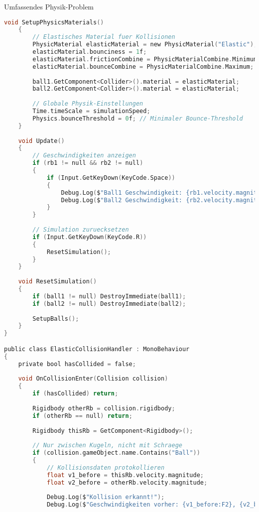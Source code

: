 \begin{example2}{Umfassendes Physik-Problem}
\begin{lstlisting}[language=C, style=basesmol]
    void SetupPhysicsMaterials() 
    {
        // Elastisches Material fuer Kollisionen
        PhysicMaterial elasticMaterial = new PhysicMaterial("Elastic");
        elasticMaterial.bounciness = 1f;
        elasticMaterial.frictionCombine = PhysicMaterialCombine.Minimum;
        elasticMaterial.bounceCombine = PhysicMaterialCombine.Maximum;
        
        ball1.GetComponent<Collider>().material = elasticMaterial;
        ball2.GetComponent<Collider>().material = elasticMaterial;
        
        // Globale Physik-Einstellungen
        Time.timeScale = simulationSpeed;
        Physics.bounceThreshold = 0f; // Minimaler Bounce-Threshold
    }
    
    void Update() 
    {
        // Geschwindigkeiten anzeigen
        if (rb1 != null && rb2 != null) 
        {
            if (Input.GetKeyDown(KeyCode.Space)) 
            {
                Debug.Log($"Ball1 Geschwindigkeit: {rb1.velocity.magnitude:F2} m/s");
                Debug.Log($"Ball2 Geschwindigkeit: {rb2.velocity.magnitude:F2} m/s");
            }
        }
        
        // Simulation zuruecksetzen
        if (Input.GetKeyDown(KeyCode.R)) 
        {
            ResetSimulation();
        }
    }
    
    void ResetSimulation() 
    {
        if (ball1 != null) DestroyImmediate(ball1);
        if (ball2 != null) DestroyImmediate(ball2);
        
        SetupBalls();
    }
}

public class ElasticCollisionHandler : MonoBehaviour 
{
    private bool hasCollided = false;
    
    void OnCollisionEnter(Collision collision) 
    {
        if (hasCollided) return;
        
        Rigidbody otherRb = collision.rigidbody;
        if (otherRb == null) return;
        
        Rigidbody thisRb = GetComponent<Rigidbody>();
        
        // Nur zwischen Kugeln, nicht mit Schraege
        if (collision.gameObject.name.Contains("Ball")) 
        {
            // Kollisionsdaten protokollieren
            float v1_before = thisRb.velocity.magnitude;
            float v2_before = otherRb.velocity.magnitude;
            
            Debug.Log($"Kollision erkannt!");
            Debug.Log($"Geschwindigkeiten vorher: {v1_before:F2}, {v2_before:F2}");
            

\end{lstlisting}
\end{example2}
